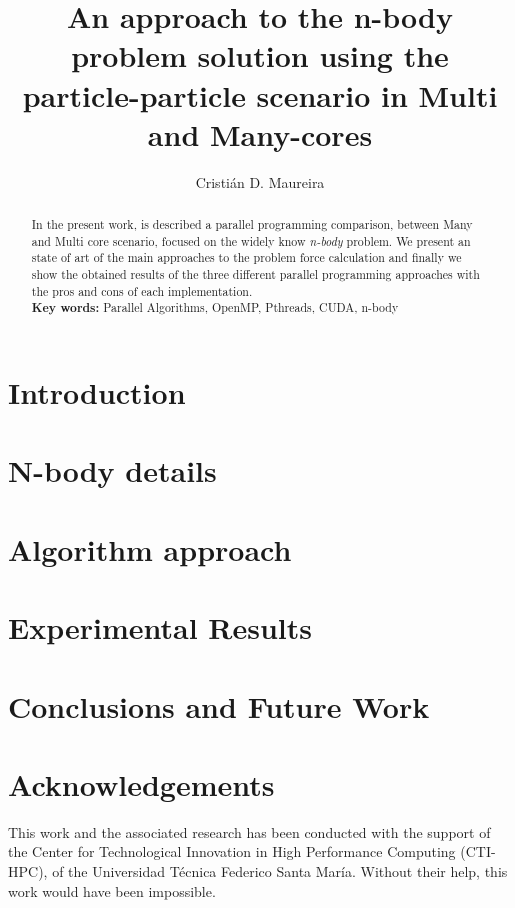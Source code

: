 \documentclass{llncs}
\begin{document}
\title{An approach to the n-body problem solution using the particle-particle scenario in Multi and Many-cores}
\author{Cristián D. Maureira}
\pagestyle{headings}  %
\maketitle

\begin{abstract}
In the present work, is described a parallel programming
comparison, between Many and Multi core scenario,
focused on the widely know \emph{n-body} problem.
We present an state of art of the main approaches to
the problem force calculation and finally
we show the obtained results of the three different
parallel programming approaches with the pros and cons
of each implementation.
\\
\textbf{Key words:} Parallel Algorithms, OpenMP, Pthreads, CUDA, n-body
\end{abstract}

\section{Introduction}
\label{introduction}



\section{N-body details}
\label{nbody-details}



\section{Algorithm approach}
\label{algorithm}



\section{Experimental Results}
\label{experimental}


\section{Conclusions and Future Work}
\label{conclusions}


\section*{Acknowledgements}

This work and the associated research has been conducted with the support of the Center for Technological Innovation in High Performance Computing (CTI-HPC),
of the Universidad Técnica Federico Santa María.
Without their help, this work would have been impossible.

\newpage


\end{document}

